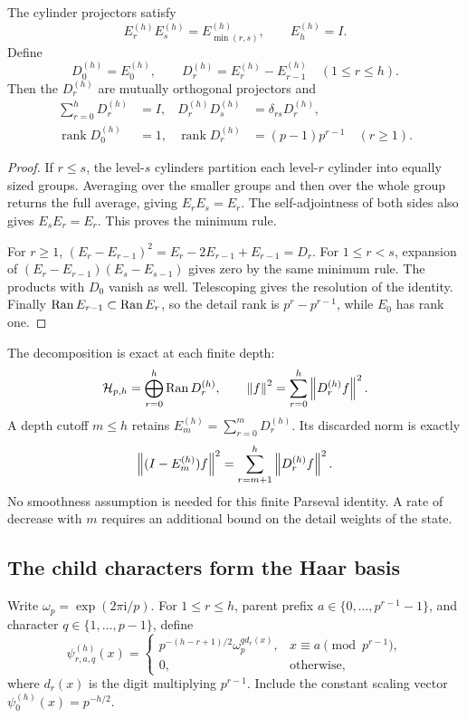\begin{proposition}
\label{a-finite-haar-resolution}
The cylinder projectors satisfy
\[
 E_r^{(h)}E_s^{(h)}=E_{\min(r,s)}^{(h)},\qquad E_h^{(h)}=I.
\]
Define
\[
 D_0^{(h)}=E_0^{(h)},\qquad
 D_r^{(h)}=E_r^{(h)}-E_{r-1}^{(h)}\quad(1\leq r\leq h).
\]
Then the $D_r^{(h)}$ are mutually orthogonal projectors and
\begin{align}
 \sum_{r=0}^hD_r^{(h)}&=I,
 &D_r^{(h)}D_s^{(h)}&=\delta_{rs}D_r^{(h)},\nonumber\\
 \operatorname{rank}D_0^{(h)}&=1,
 &\operatorname{rank}D_r^{(h)}&=(p-1)p^{r-1}\quad(r\geq1).
 \label{a-finite-detail-ranks}
\end{align}
\end{proposition}

\begin{proof}
If $r\leq s$, the level-$s$ cylinders partition each level-$r$
cylinder into equally sized groups. Averaging over the smaller groups
and then over the whole group returns the full average, giving
$E_rE_s=E_r$. The self-adjointness of both sides also gives
$E_sE_r=E_r$. This proves the minimum rule.

For $r\geq1$,
$(E_r-E_{r-1})^2=E_r-2E_{r-1}+E_{r-1}=D_r$.
For $1\leq r<s$, expansion of
$(E_r-E_{r-1})(E_s-E_{s-1})$ gives zero by the same minimum
rule. The products with $D_0$ vanish as well. Telescoping gives the
resolution of the identity. Finally $\operatorname{Ran} E_{r-1}\subset\operatorname{Ran} E_r$,
so the detail rank is $p^r-p^{r-1}$, while $E_0$ has rank one.
\end{proof}

The decomposition is exact at each finite depth:
\begin{equation}
 \mathcal H_{p,h}=\bigoplus_{r=0}^h\operatorname{Ran} D_r^{(h)},\qquad
 \left\lVert f\right\rVert^2=\sum_{r=0}^h\left\lVert D_r^{(h)}f\right\rVert^2.
 \label{a-finite-parseval}
\end{equation}
A depth cutoff $m\leq h$ retains $E_m^{(h)}=\sum_{r=0}^mD_r^{(h)}$.
Its discarded norm is exactly
\[
 \left\lVert(I-E_m^{(h)})f\right\rVert^2=
 \sum_{r=m+1}^h\left\lVert D_r^{(h)}f\right\rVert^2.
\]
No smoothness assumption is needed for this finite Parseval identity.
A rate of decrease with $m$ requires an additional bound on the detail
weights of the state.

\subsection{The child characters form the Haar basis}

Write $\omega_p=\exp(2\pi\mathrm{i}/p)$. For $1\leq r\leq h$,
parent prefix $a\in\{0,\ldots,p^{r-1}-1\}$, and character
$q\in\{1,\ldots,p-1\}$, define
\begin{equation}
 \psi_{r,a,q}^{(h)}(x)=
 \begin{cases}
 p^{-(h-r+1)/2}\omega_p^{q d_r(x)},
       &x\equiv a\pmod{p^{r-1}},\\
 0,&\text{otherwise},
 \end{cases}
 \label{a-finite-wavelet}
\end{equation}
where $d_r(x)$ is the digit multiplying $p^{r-1}$. Include the
constant scaling vector $\psi_0^{(h)}(x)=p^{-h/2}$.

